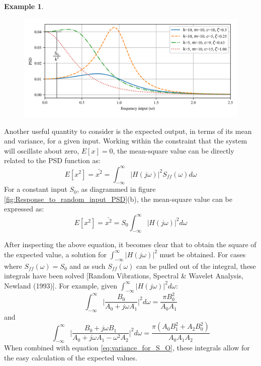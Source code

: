 \documentclass[12pt,letter]{article}
\newtheorem{ex}{Example}
\numberwithin{ex}{section} %
\newenvironment{example}{\begin{mdframed}[middlelinewidth=0.5mm]\begin{ex}\normalfont}{\end{ex}\end{mdframed}}
\numberwithin{re}{section} %
\begin{document}
\begin{example}
\begin{figure}[H]
		\centering
		\includegraphics[width=1\textwidth]{../Figures/response_to_white_noise_with_annotation.png}
	\end{figure}
\end{example}  

Another useful quantity to consider is the expected output, in terms of its mean and variance, for a given input. Working within the constraint that the system will oscillate about zero, $E[x]=0$, the mean-square value can be directly related to the PSD function as:
\begin{equation}
E[x^2] = \bar{x^2} =   \int_{-\infty}^{\infty} |H(j\omega)|^2 S_{ff}(\omega) d\omega
\end{equation}
For a constant input $S_0$, as diagrammed in figure \ref{fig:Response_to_random_input_PSD}(b), the mean-square value can be expressed as:
\begin{equation}
E[x^2] = \bar{x^2} =   S_{0} \int_{-\infty}^{\infty} |H(j\omega)|^2 d\omega
\label{eq:variance_for_S_O}
\end{equation}

After inspecting the above equation, it becomes clear that to obtain the square of the expected value, a solution for  $\int_{-\infty}^{\infty} |H(j\omega)|^2$ must be obtained. For cases where $S_{ff}(\omega) = S_0$ and as such $S_{ff}(\omega)$ can be pulled out of the integral, these integrals have been solved [Random Vibrations, Spectral \& Wavelet Analysis, Newland (1993)]. For example, given $\int_{-\infty}^{\infty} |H(j\omega)|^2 d\omega$:
\begin{equation}
\int_{-\infty}^{\infty} \bigg|\frac{B_0}{A_0+j \omega A_1} \bigg|^2 d\omega = \frac{\pi B_0^2}{A_0 A_1}
\end{equation} 
and
\begin{equation}
\int_{-\infty}^{\infty} \bigg|\frac{B_0 + j \omega B_1}{A_0+j \omega A_1 - \omega^2 A_2} \bigg|^2 d\omega = \frac{\pi (A_0 B_1^2 + A_2 B_0^2)}{A_0 A_1 A_2}
\end{equation} 
When combined with equation \ref{eq:variance_for_S_O}, these integrals allow for the easy calculation of the expected values. 
\end{document}

